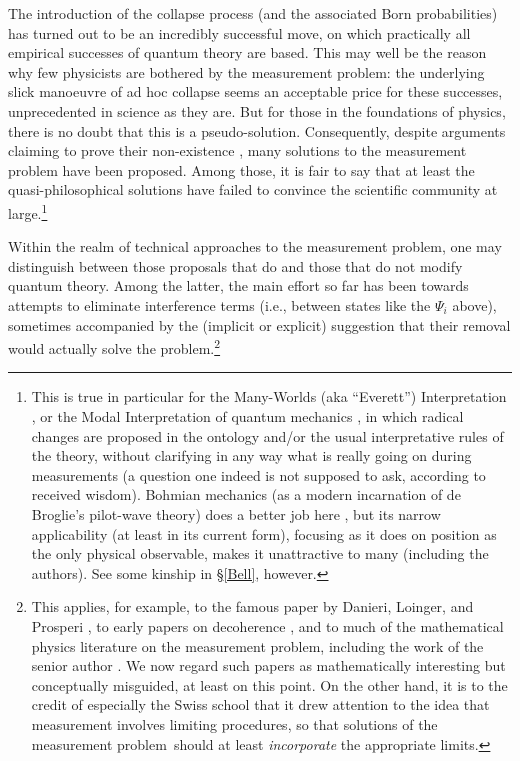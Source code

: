 \documentclass[12pt]{article}
\newcommand{\mmp}{measurement problem}
\begin{document}
The introduction of the collapse process (and the associated Born probabilities) has turned out to be an incredibly successful move, on which practically all empirical successes of quantum theory are based. This may well be the reason why few physicists are bothered by the measurement problem: 
 the underlying slick manoeuvre of ad hoc collapse seems an acceptable price for
these successes, unprecedented in science as they are. But for those in the foundations of physics, there is no doubt that this is a pseudo-solution.
Consequently, despite arguments claiming to prove their non-existence \cite{Brown,BLM,Fine}, 
many solutions to the measurement problem have been proposed. Among those, it is fair to say that at least the quasi-philosophical solutions have failed to 
 convince the scientific community at large.\footnote{This is true in particular for  the Many-Worlds (aka ``Everett'') Interpretation \cite{MWI}, or the Modal Interpretation of quantum mechanics \cite{Modal}, in which radical changes are proposed in the ontology and/or the usual interpretative rules of the theory, without clarifying in any way what is really going on during measurements (a question one indeed is not supposed to ask, according to received wisdom). Bohmian mechanics (as a modern incarnation of de Broglie's pilot-wave theory) does a better job here  \cite{CushingFine,DGZ,DT}, but its narrow applicability (at least in its current form), focusing as it does on position as the only physical observable, makes it unattractive to many (including the authors). See some kinship in \S\ref{Bell}, however.}

Within the realm of technical approaches to the measurement problem, one may distinguish between those proposals that do and those that do not modify quantum theory. Among the latter, 
the main effort so far has been towards attempts to eliminate interference terms (i.e., between  states like the $\Psi_i$ above), sometimes accompanied by the (implicit or explicit) suggestion that their removal would actually solve the problem.\footnote{This applies, for example, to the famous paper by Danieri,  Loinger, and Prosperi \cite{DLP}, to
early papers on decoherence \cite{Zurek1}, and to much of  the mathematical physics literature on the \mmp, including the work of the senior author \cite{EWW,Hepp,Landsman1991,KlaasObs,Sewellrecent}. We now regard such papers as mathematically interesting but conceptually misguided, at least on this point. On the other hand,  it is to the credit of especially the Swiss school that it drew attention to the
idea that measurement involves limiting procedures, so that solutions of the \mmp\ should at least \emph{incorporate} the appropriate limits. } 
 
\end{document}
